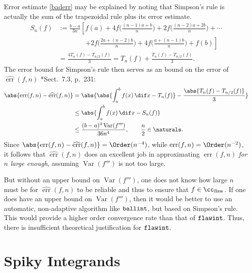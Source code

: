 \documentclass[]{article}
\DeclareMathOperator{\flawinteg}{\texttt{\textup{flawint}}}
\DeclareMathOperator{\ballinteg}{\texttt{\textup{ballint}}}
\DeclareMathOperator{\Var}{Var}
\DeclareMathOperator{\err}{err}
\newcommand{\herr}{\widehat{\err}}
\theoremstyle{definition}
\theoremstyle{remark}
\begin{document}
Error estimate \eqref{baderr} may be explained by noting that Simpson's rule is actually the sum of the trapezoidal rule plus its error estimate.
\begin{align*}
S_n(f) &:= \frac{b-a}{3n} \left [ f(a) + 4 f\biggl(\frac{(n-1)a+b}{n}\biggr) + 2 f\biggl(\frac{(n-2)a+2b}{n}\biggr) + \cdots  \right .\\
 & \qquad \qquad \left . + 2 f\biggl(\frac{2a+ (n-2)b}{n}\biggr) + 4 f\biggl(\frac{a+(n-1)b}{n}\biggr) + f(b) \right] \\
& = \frac{4T_n(f) - T_{n/2}(f)}{3} =  T_n(f) + \frac{T_n(f) - T_{n/2}(f)}{3}.
\end{align*}
The error bound for Simpson's rule then serves as an bound on the error of $\herr(f,n)$ \cite{BraPet11a}*{Sect.\ 7.3, p.\ 231}:
\begin{align} 
\nonumber
\abs{\err(f,n) - \herr(f,n)} & = \abs{\abs{\int_a^b f(x) \, \dif x - T_n(f)} - \frac{\abs{T_n(f) - T_{n/2}(f)}}{3}} \\
\nonumber & \le \abs{\int_a^b f(x) \, \dif x - S_n(f)} \\
& \le \frac{(b-a)^4 \Var(f''')}{36n^4}, \qquad \frac{n}2 \in \naturals. \label{Simperrbd}
\end{align}
Since $\abs{\err(f,n) - \herr(f,n)}=\Order(n^{-4})$, while $\err(f,n) = \Order(n^{-2})$, it follows that $\herr(f,n)$ does an excellent job in approximating $\err(f,n)$ \emph{for $n$ large enough}, assuming $\Var(f''')$ is not too large.

But without an upper bound on $\Var(f''')$, one does not know how large $n$ must be for $\herr(f,n)$ to be reliable and thus to ensure that $f \in \cc_{\text{flaw}}$.  If one does have an upper bound on $\Var(f''')$, then it would be better to use an automatic, non-adaptive algorithm like $\ballinteg$, but based on Simpson's rule.  This would provide a higher order convergence rate than that of $\flawinteg$.  Thus, there is insufficient theoretical justification for $\flawinteg$.

\section{Spiky Integrands} \label{spikysec}
\end{document}
